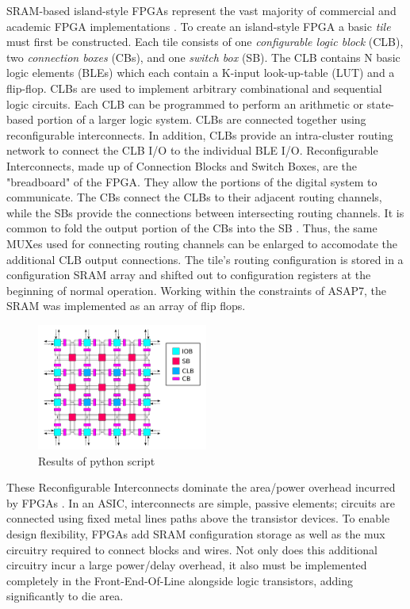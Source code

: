\documentclass[twoside,twocolumn]{article}
\begin{document}
SRAM-based island-style FPGAs represent the vast majority of commercial and academic
FPGA implementations \cite{farooq_fpga_2012}. To create an island-style FPGA a basic \textit{tile} must first be constructed. 
Each tile consists of one \textit{configurable logic block} (CLB), 
two \textit{connection boxes} (CBs), and one \textit{switch box} (SB). 
The CLB contains N basic logic elements (BLEs) which each contain a K-input 
look-up-table (LUT) and a flip-flop. CLBs are used to implement arbitrary combinational and sequential logic circuits. 
Each CLB can be programmed to perform an arithmetic or state-based portion of a larger logic system. CLBs are connected together using reconfigurable interconnects. In addition, CLBs provide an intra-cluster routing network to connect the CLB I/O to the individual BLE I/O. Reconfigurable Interconnects, made up of Connection Blocks and Switch Boxes, are the "breadboard" of the FPGA. They allow the portions of the digital system to communicate. The CBs connect the CLBs to their adjacent routing channels, while the SBs provide the connections
between intersecting routing channels. It is common to fold the output portion of 
the CBs into the SB \cite{chen_efficient_2010}. Thus, the same MUXes used for
connecting routing channels can be enlarged to accomodate the additional 
CLB output connections. The tile's routing configuration is stored in a configuration SRAM array
and shifted out to configuration registers at the beginning of normal operation. Working within
the constraints of ASAP7, the SRAM was implemented as an array of flip flops.

\begin{figure}[!hbt]
    \centering
    \caption{Results of python script}
    \label{fig:results}
    \includegraphics[width=0.5\textwidth]{figs/island_style.png}
\end{figure}

These Reconfigurable Interconnects dominate the area/power overhead incurred by FPGAs \cite{ALTERA}. In an ASIC, interconnects are simple, passive elements; circuits are connected using fixed metal lines paths above the transistor devices. To enable design flexibility, FPGAs add SRAM configuration storage as well as the mux circuitry required to connect blocks and wires. Not only does this additional circuitry incur a large power/delay overhead, it also must be implemented completely in the Front-End-Of-Line alongside logic transistors, adding significantly to die area.
\end{document}
